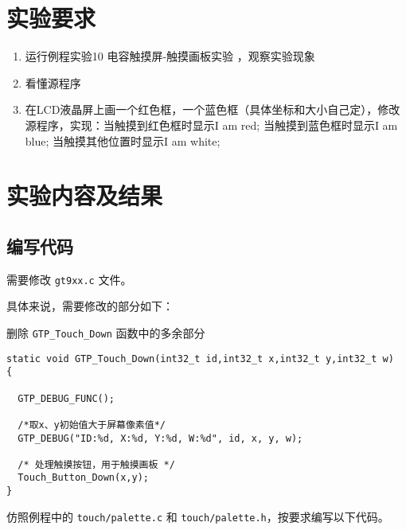 \documentclass{math201}
\begin{document}

\makecover


\section{实验要求}

\begin{enumerate}
  \item 运行例程实验10 电容触摸屏-触摸画板实验 ，观察实验现象
  \item 看懂源程序
  \item 在LCD液晶屏上画一个红色框，一个蓝色框（具体坐标和大小自己定），修改源程序，实现：当触摸到红色框时显示I am red; 当触摸到蓝色框时显示I am blue; 当触摸其他位置时显示I am white;
\end{enumerate}

\section{实验内容及结果}

\subsection{编写代码}

需要修改 \texttt{gt9xx.c} 文件。


具体来说，需要修改的部分如下：

删除 \texttt{GTP\_Touch\_Down} 函数中的多余部分

\begin{verbatim}
static void GTP_Touch_Down(int32_t id,int32_t x,int32_t y,int32_t w)
{
  
  GTP_DEBUG_FUNC();

  /*取x、y初始值大于屏幕像素值*/
  GTP_DEBUG("ID:%d, X:%d, Y:%d, W:%d", id, x, y, w);

  /* 处理触摸按钮，用于触摸画板 */
  Touch_Button_Down(x,y); 
}
\end{verbatim}

仿照例程中的 \texttt{touch/palette.c} 和 \texttt{touch/palette.h}，按要求编写以下代码。
\end{document}

